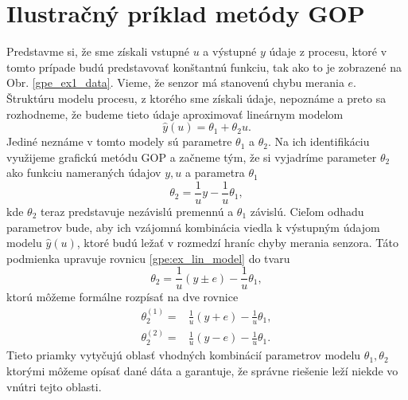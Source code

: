 \section{Ilustračný príklad metódy GOP}
Predstavme si, že sme získali vstupné $ u $ a výstupné $ y $ údaje z procesu, ktoré v tomto prípade budú predstavovať konštantnú funkciu, tak ako to je zobrazené na Obr. \ref{gpe_ex1_data}. Vieme, že senzor má stanovenú chybu merania $ e $. Štruktúru modelu procesu, z ktorého sme získali údaje, nepoznáme a preto sa rozhodneme, že budeme tieto údaje aproximovať lineárnym modelom
\begin{equation}
	\hat{y}(u) = \theta_1 + \theta_2u.
\end{equation}
 Jediné neznáme v tomto modely sú parametre $ \theta_1 $ a $ \theta_2 $. Na ich identifikáciu využijeme grafickú metódu GOP a začneme tým, že si vyjadríme parameter $ \theta_2 $ ako funkciu nameraných údajov $ y, u $ a parametra $ \theta_1 $
\begin{equation} \label{gpe:ex_lin_model}
	\theta_2 = \frac{1}{u}y - \frac{1}{u}\theta_1,
\end{equation}
kde $ \theta_2 $ teraz predstavuje nezávislú premennú a $ \theta_1 $ závislú. Cieľom odhadu parametrov bude, aby ich vzájomná kombinácia viedla k výstupným údajom modelu $ \hat{y}(u) $, ktoré budú ležať v rozmedzí hraníc chyby merania senzora. Táto podmienka upravuje rovnicu \ref{gpe:ex_lin_model} do tvaru
\begin{equation} 
	\theta_2 = \frac{1}{u}\left(y \pm e\right) - \frac{1}{u}\theta_1,
\end{equation}
ktorú môžeme formálne rozpísať na dve rovnice 
\begin{equation}
	\begin{split}
		\theta_2^{(1)} =& \frac{1}{u}\left(y + e\right) - \frac{1}{u}\theta_1,\\
		\theta_2^{(2)} =& \frac{1}{u}\left(y - e\right) - \frac{1}{u}\theta_1.
	\end{split} 
\end{equation}
Tieto priamky vytyčujú oblasť vhodných kombinácií parametrov modelu $ \theta_1, \theta_2 $ ktorými môžeme opísať dané dáta a garantuje, že správne riešenie leží niekde vo vnútri tejto oblasti.

